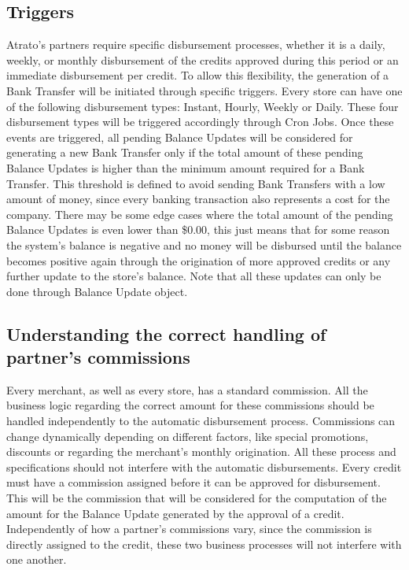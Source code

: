 \subsection{Triggers}
Atrato’s partners require specific disbursement processes, whether it is a daily, weekly, or monthly disbursement of the credits approved during this period or an immediate disbursement per credit. To allow this flexibility, the generation of a Bank Transfer will be initiated through specific triggers. Every store can have one of the following disbursement types: Instant, Hourly, Weekly or Daily.
These four disbursement types will be triggered accordingly through Cron Jobs. Once these events are triggered, all pending Balance Updates will be considered for generating a new Bank Transfer only if the total amount of these pending Balance Updates is higher than the minimum amount required for a Bank Transfer. This threshold is defined to avoid sending Bank Transfers with a low amount of money, since every banking transaction also represents a cost for the company. There may be some edge cases where the total amount of the pending Balance Updates is even lower than \$0.00, this just means that for some reason the system’s balance is negative and no money will be disbursed until the balance becomes positive again through the origination of more approved credits or any further update to the store’s balance. Note that all these updates can only be done through Balance Update object.
\subsection{Understanding the correct handling of partner’s commissions}
Every merchant, as well as every store, has a standard commission. All the business logic regarding the correct amount for these commissions should be handled independently to the automatic disbursement process. 
Commissions can change dynamically depending on different factors, like special promotions, discounts or regarding the merchant’s monthly origination. All these process and specifications should not interfere with the automatic disbursements. Every credit must have a commission assigned before it can be approved for disbursement. This will be the commission that will be considered for the computation of the amount for the Balance Update generated by the approval of a credit. 
Independently of how a partner’s commissions vary, since the commission is directly assigned to the credit, these two business processes will not interfere with one another.

